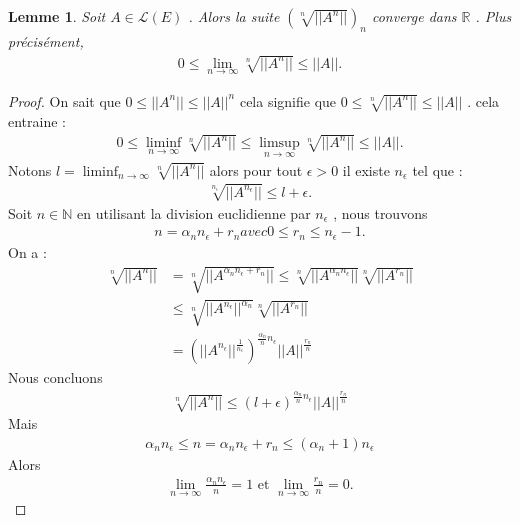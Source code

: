 \documentclass{report}
\newtheorem{Lem}{Lemme}[subsection]
\begin{document}
{\begin{Lem} Soit $A \in \mathscr{L}(E)$ . Alors la suite $(\sqrt[n]{||A^n||})_n$ converge dans $\mathbb{R}$ . Plus précisément, 
					\begin{align*}
						 0 \le \lim_{n\to \infty} \sqrt[n]{||A^n||} \le ||A|| .
					\end{align*}
\end{Lem}
\begin{proof}
On sait que $0 \le ||A^n|| \le ||A||^n$  cela signifie que $0 \le \sqrt[n]{||A^n||} \le ||A||$ . cela entraine : 
					\begin{align*}
						 0 \le \liminf_{n\to \infty} \sqrt[n]{||A^n||} \le \limsup_{n\to \infty} \sqrt[n]{||A^n||} \le ||A|| .
					\end{align*}
Notons $l = \liminf_{n\to \infty} \sqrt[n]{||A^n||}$ alors pour tout $\epsilon > 0$ il existe $n_{\epsilon}$ tel que : 
					\begin{align*}
						 \sqrt[n_{\epsilon}]{||A^{n_{\epsilon}}||} \le l + \epsilon .
					\end{align*}
Soit $n \in \mathbb{N}$ en utilisant la division euclidienne par $n_{\epsilon}$ , nous trouvons 
					\begin{align*}
						 n = \alpha_n n_{\epsilon} + r_n avec 0 \le r_n \le n_{\epsilon} - 1 .
					\end{align*}
On a : 
					\begin{align*}
						 \sqrt[n]{||A^n||} &= \sqrt[n]{||A^{\alpha_n n_{\epsilon} + r_n}||} \le \sqrt[n]{||A^{\alpha_n n_{\epsilon}}||} \sqrt[n]{||A^{r_n}||} \\
						 &\le \sqrt[n]{||A^{n_{\epsilon}}||^{\alpha_n}} \sqrt[n]{||A^{r_n}||} \\
						 &= (||A^{n_{\epsilon}}||^{\frac{1}{n_{\epsilon}}})^{ \frac{\alpha_n}{n} n_{\epsilon} } ||A||^{\frac{r_n}{n}} 
					\end{align*}
Nous concluons 
					\begin{align*}
						 \sqrt[n]{||A^n||} \le (l + \epsilon)^{\frac{\alpha_n}{n} n_{\epsilon}} ||A||^{\frac{r_n}{n}} 
					\end{align*}
Mais 
					\begin{align*}
						 \alpha_n n_\epsilon \le n = \alpha_n n_\epsilon + r_n \le (\alpha_n + 1) n_\epsilon 
					\end{align*}
Alors 
					\begin{align*}
						 \lim_{n\to \infty} \frac{\alpha_n n_\epsilon}{n} = 1 \,\,\text{et}\,\, \lim_{n\to \infty} \frac{r_n}{n} = 0 .
					\end{align*}


\end{proof}}
\end{document}
